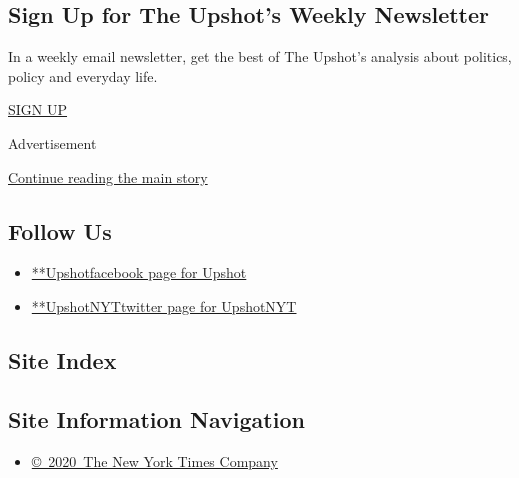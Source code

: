 \hypertarget{sign-up-for-the-upshots-weekly-newsletter}{%
\subsection{Sign Up for The Upshot's Weekly
Newsletter}\label{sign-up-for-the-upshots-weekly-newsletter}}

In a weekly email newsletter, get the best of The Upshot's analysis
about politics, policy and everyday life.

\href{/newsletters/signup/UP}{SIGN UP}

Advertisement

\protect\hyperlink{after-mktg}{Continue reading the main story}

\hypertarget{follow-us}{%
\subsection{Follow Us}\label{follow-us}}

\begin{itemize}
\tightlist
\item
  \href{https://www.facebook.com/Upshot}{**Upshotfacebook page for
  Upshot}
\item
  \href{https://twitter.com/UpshotNYT}{**UpshotNYTtwitter page for
  UpshotNYT}
\end{itemize}

\hypertarget{site-index}{%
\subsection{Site Index}\label{site-index}}

\hypertarget{site-information-navigation}{%
\subsection{Site Information
Navigation}\label{site-information-navigation}}

\begin{itemize}
\tightlist
\item
  \href{https://help.nytimes.com/hc/en-us/articles/115014792127-Copyright-notice}{©~2020~The
  New York Times Company}
\end{itemize}

